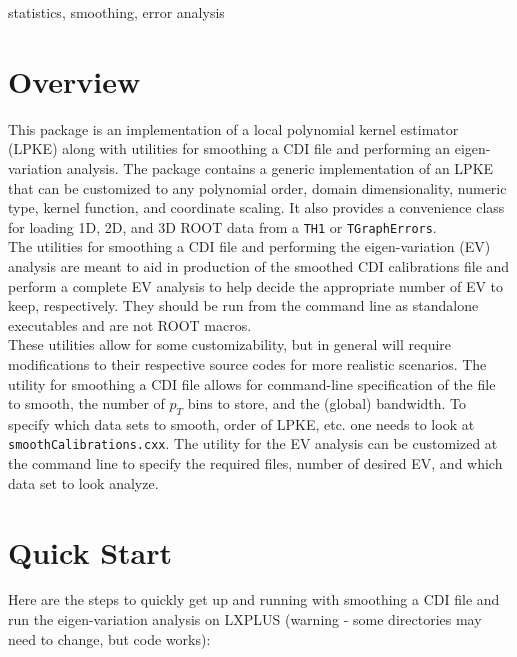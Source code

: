 \begin{description}
\itemsep1pt\parskip0pt
\item[Keywords]
statistics, smoothing, error analysis
\end{description}

\pagebreak

\section{Overview}\label{OV}

This package is an implementation of a local polynomial kernel estimator
(LPKE) along with utilities for smoothing a CDI file and performing an
eigen-variation analysis. The package contains a generic implementation
of an LPKE that can be customized to any polynomial order, domain
dimensionality, numeric type, kernel function, and coordinate scaling.
It also provides a convenience class for loading 1D, 2D, and 3D ROOT
data from a \texttt{TH1} or \texttt{TGraphErrors}.\\The utilities for
smoothing a CDI file and performing the eigen-variation (EV) analysis
are meant to aid in production of the smoothed CDI calibrations file and
perform a complete EV analysis to help decide the appropriate number of
EV to keep, respectively. They should be run from the command line as
standalone executables and are not ROOT macros.\\These utilities allow
for some customizability, but in general will require modifications to
their respective source codes for more realistic scenarios. The utility
for smoothing a CDI file allows for command-line specification of the
file to smooth, the number of $p_T$ bins to store, and the (global)
bandwidth. To specify which data sets to smooth, order of LPKE, etc. one
needs to look at \texttt{smoothCalibrations.cxx}. The utility for the EV
analysis can be customized at the command line to specify the required
files, number of desired EV, and which data set to look analyze.

\section{Quick Start}\label{quick-start}

Here are the steps to quickly get up and running with smoothing a CDI
file and run the eigen-variation analysis on LXPLUS (warning - some
directories may need to change, but code works):

